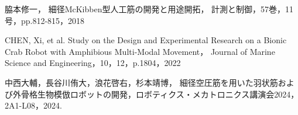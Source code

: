 \documentclass{jarticle}
\begin{document}
\begin{thebibliography}{99}

  脇本修一，
  細径McKibben型人工筋の開発と用途開拓，
  計測と制御，57巻，11号，pp.812-815，2018
  
  CHEN, Xi, et al. Study on the Design and Experimental Research on a Bionic Crab Robot with Amphibious Multi-Modal Movement， Journal of Marine Science and Engineering，10，12，p.1804，2022
  
  中西大輔，長谷川侑大，浪花啓右，杉本靖博，
  細径空圧筋を用いた羽状筋および外骨格生物模倣ロボットの開発，ロボティクス・メカトロニクス講演会2024，2A1-L08，2024.

  
  
 \end{thebibliography}
\end{document}
